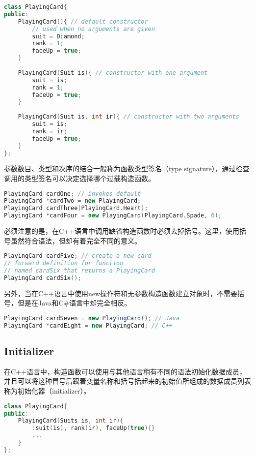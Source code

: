 \begin{lstlisting}[language=C++]
class PlayingCard{
public:
	PlayingCard(){ // default constructor
		// used when no arguments are given
		suit = Diamond;
		rank = 1;
		faceUp = true;
	}
	
	PlayingCard(Suit is){ // constructor with one argument
		suit = is;
		rank = 1;
		faceUp = true;
	}
	
	PlayingCard(Suit is, int ir){ // constructor with two arguments
		suit = is;
		rank = ir;
		faceUp = true;
	}
};
\end{lstlisting}


参数数目、类型和次序的结合一般称为函数类型签名（type signature），通过检查调用的类型签名可以决定选择哪个过载构造函数。


\begin{lstlisting}[language=C++]
PlayingCard cardOne; // invokes default
PlayingCard *cardTwo = new PlayingCard;
PlayingCard cardThree(PlayingCard.Heart);
PlayingCard *cardFour = new PlayingCard(PlayingCard.Spade, 6);
\end{lstlisting}

必须注意的是，在C++语言中调用缺省构造函数时必须去掉括号。这里，使用括号虽然符合语法，但却有着完全不同的意义。



\begin{lstlisting}[language=C++]
PlayingCard cardFive; // create a new card
// forward definition for function 
// named cardSix that returns a PlayingCard
PlayingCard cardSix(); 
\end{lstlisting}

另外，当在C++语言中使用new操作符和无参数构造函数建立对象时，不需要括号，但是在Java和C\#语言中却完全相反。


\begin{lstlisting}[language=Java]
PlayingCard cardSeven = new PlayingCard(); // Java
PlayingCard *cardEight = new PlayingCard; // C++
\end{lstlisting}


\subsection{Initializer}



在C++语言中，构造函数可以使用与其他语言稍有不同的语法初始化数据成员，并且可以将这种冒号后跟着变量名称和括号括起来的初始值所组成的数据成员列表称为初始化器（initializer）。


\begin{lstlisting}[language=C++]
class PlayingCard{
public:
	PlayingCard(Suits is, int ir){
		:suit(is), rank(ir), faceUp(true){}
		...
	}
};
\end{lstlisting}

